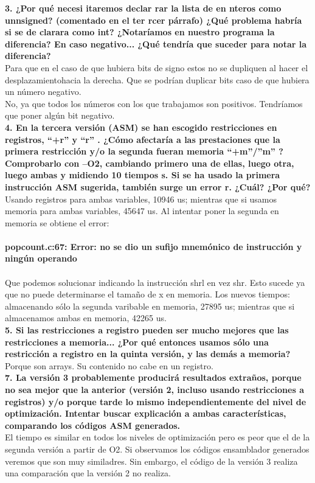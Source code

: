 \documentclass[11pt,a4paper]{article}
\begin{document}
\textbf{3. ¿Por qué necesi itaremos declar rar la lista de en nteros como unnsigned? (comentado en el ter rcer párrafo) ¿Qué problema habría si se de clarara como int? ¿Notaríamos en nuestro programa la diferencia? En caso negativo... ¿Qué tendría que suceder para notar la diferencia? } \\

Para que en el caso de que hubiera bits de signo estos no se dupliquen al hacer el desplazamientohacia la derecha. Que se podrían duplicar bits caso de que hubiera un número negativo. \\
No, ya que todos los números con los que trabajamos son positivos. Tendríamos que poner algún bit negativo. \\

\textbf{4. En la tercera versión (ASM) se han escogido restricciones en registros, “+r” y “r” . ¿Cómo afectaría a las prestaciones que la primera restricción y/o la segunda fueran memoria “+m”/”m” ? Comprobarlo con –O2, cambiando primero una de ellas, luego otra, luego ambas y midiendo 10 tiempos s. Si se ha usado la primera instrucción ASM sugerida, también surge un error r. ¿Cuál? ¿Por qué? } \\

Usando registros para ambas variables, 10946 us; mientras que si usamos memoria para ambas variables, 45647 us. Al intentar poner la segunda en memoria se obtiene el error: \\ \\
\textbf{popcount.c:67: Error: no se dio un sufijo mnemónico de instrucción y ningún operando} \\ \\
Que podemos solucionar indicando la instrucción shrl en vez shr. Esto sucede ya que no puede determinarse el tamaño de x en memoria. Los nuevos tiempos: almacenando sólo la segunda varibable en memoria, 27895 us; mientras que si almacenamos ambas en memoria, 42265 us. \\

\textbf{5. Si las restricciones a registro pueden ser mucho mejores que las restricciones a memoria... ¿Por qué entonces usamos sólo una restricción a registro en la quinta versión, y las demás a memoria? } \\

Porque son arrays. Su contenido no cabe en un registro. \\

\textbf{7. La versión 3 probablemente producirá resultados extraños, porque no sea mejor que la anterior (versión 2, incluso usando restricciones a registros) y/o porque tarde lo mismo independientemente del nivel de optimización. Intentar buscar explicación a ambas características, comparando los códigos ASM generados.} \\

El tiempo es similar en todos los niveles de optimización pero es peor que el de la segunda versión a partir de O2. Si observamos los códigos ensamblador generados veremos que son muy similadres. Sin embargo, el código de la versión 3 realiza una comparación que la versión 2 no realiza. \\
\end{document}
